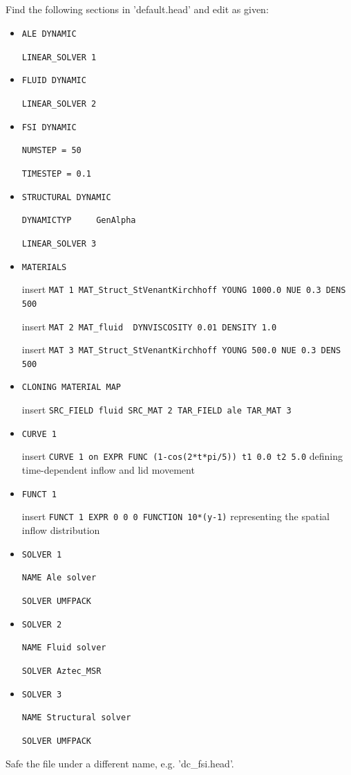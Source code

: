 \subsection{\head}
Find the following sections in 'default.head' and edit as given:
\begin{itemize}

 \item \verb|ALE DYNAMIC|

 \verb|LINEAR_SOLVER 1|

 \item \verb|FLUID DYNAMIC|

 \verb|LINEAR_SOLVER 2|

 \item \verb|FSI DYNAMIC|

 \verb|NUMSTEP = 50|

 \verb|TIMESTEP = 0.1|

 \item \verb|STRUCTURAL DYNAMIC|

 \verb|DYNAMICTYP     GenAlpha|

 \verb|LINEAR_SOLVER 3|

 \item \verb|MATERIALS|

  insert \verb|MAT 1 MAT_Struct_StVenantKirchhoff YOUNG 1000.0 NUE 0.3 DENS 500|

  insert \verb|MAT 2 MAT_fluid  DYNVISCOSITY 0.01 DENSITY 1.0|

  insert \verb|MAT 3 MAT_Struct_StVenantKirchhoff YOUNG 500.0 NUE 0.3 DENS 500|

  \item \verb|CLONING MATERIAL MAP|

  insert \verb|SRC_FIELD fluid SRC_MAT 2 TAR_FIELD ale TAR_MAT 3|

  \item \verb|CURVE 1|

  insert \verb|CURVE 1 on EXPR FUNC (1-cos(2*t*pi/5)) t1 0.0 t2 5.0| defining time-dependent inflow and lid movement

  \item \verb|FUNCT 1|

  insert \verb|FUNCT 1 EXPR 0 0 0 FUNCTION 10*(y-1)| representing the spatial inflow distribution

 \item \verb|SOLVER 1|

 \verb|NAME Ale solver|

 \verb|SOLVER UMFPACK|

 \item \verb|SOLVER 2|

 \verb|NAME Fluid solver|

 \verb|SOLVER Aztec_MSR|

 \item \verb|SOLVER 3|

 \verb|NAME Structural solver|

 \verb|SOLVER UMFPACK|

\end{itemize}
Safe the file under a different name, e.g. 'dc\_fsi.head'.

